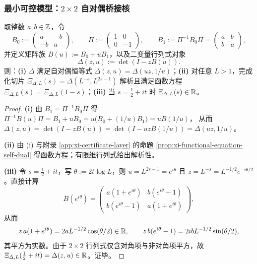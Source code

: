 \subsubsection{最小可控模型：$2\times 2$ 自对偶桥接核}\label{subsubsec:cc-bridge-minimal}
\begin{proposition}[最小可控自对偶模型]\label{prop:cc-bridge-2x2}
取整数 $a,b\in\mathbb{Z}$，令
$$
B_0:=\begin{pmatrix} a & -b\\ -b & a\end{pmatrix},\qquad
\Pi:=\begin{pmatrix} 1 & 0\\ 0 & -1\end{pmatrix},\qquad
B_1:=\Pi^{-1}B_0\Pi=\begin{pmatrix} a & b\\ b & a\end{pmatrix},
$$
并定义矩阵族 $B(u):=B_0+uB_1$，以及二变量行列式对象
$$
\Delta(z,u):=\det(I-zB(u)).
$$
则：\textbf{(i)} $\Delta$ 满足自对偶恒等式 $\Delta(z,u)=\Delta(uz,1/u)$；\textbf{(ii)} 对任意 $L>1$，完成化切片 $\Xi_{\Delta,L}(s)=\Delta(L^{-s},L^{2s-1})$ 解析且满足函数方程 $\Xi_{\Delta,L}(s)=\Xi_{\Delta,L}(1-s)$；\textbf{(iii)} 当 $s=\frac12+it$ 时 $\Xi_{\Delta,L}(s)\in\mathbb{R}$。
\end{proposition}

\begin{proof}
\textbf{(i)} 由 $B_1=\Pi^{-1}B_0\Pi$ 得
$
\Pi^{-1}B(u)\Pi=B_1+uB_0=u\bigl(B_0+(1/u)B_1\bigr)=uB(1/u)
$，
从而
$
\Delta(z,u)=\det(I-zB(u))=\det(I-uzB(1/u))=\Delta(uz,1/u)
$。\par
\textbf{(ii)} 由 (i) 与附录 \ref{app:xi-certificate-layer} 的命题 \ref{prop:xi-functional-equation-self-dual} 得函数方程；有限维行列式给出解析性。\par
\textbf{(iii)} 令 $s=\frac12+it$，写 $\theta:=2t\log L$，则 $u=L^{2s-1}=e^{i\theta}$ 且 $z=L^{-s}=L^{-1/2}e^{-i\theta/2}$。直接计算
$$
B(e^{i\theta})=\begin{pmatrix} a(1+e^{i\theta}) & b(e^{i\theta}-1)\\ b(e^{i\theta}-1) & a(1+e^{i\theta})\end{pmatrix},
$$
从而
$$
z\,a(1+e^{i\theta})=2aL^{-1/2}\cos(\theta/2)\in\mathbb{R},\qquad
z\,b(e^{i\theta}-1)=2ibL^{-1/2}\sin(\theta/2),
$$
其平方为实数。由于 $2\times 2$ 行列式仅含对角项与非对角项平方，故 $\Xi_{\Delta,L}(\frac12+it)=\Delta(z,u)\in\mathbb{R}$。证毕。
\end{proof}


